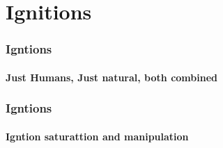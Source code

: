 \section{Ignitions}
\begin{frame}
    \frametitle{Igntions}
    \framesubtitle{Just Humans, Just natural, both combined}


\end{frame}

\begin{frame}
    \frametitle{Igntions}
    \framesubtitle{Igntion saturattion and manipulation}


\end{frame}
